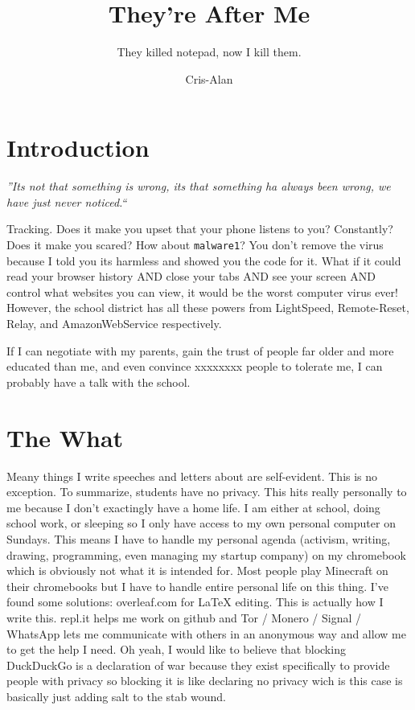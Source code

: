 \documentclass{article}
\title{They're After Me}
\author{They killed notepad, now I kill them.}
\date{Cris-Alan}
\begin{document}
\maketitle
\pagestyle{fancy}
\thispagestyle{fancy}
\section{Introduction}
\begin{center}
    \emph{''Its not that something is wrong, its that something ha always been wrong, we have just never noticed.``}
\end{center}
Tracking. Does it make you upset that your phone listens to you?
Constantly? Does it make you scared? How about \texttt{malware1}?
You don't remove the virus because I told you its harmless and 
showed you the code for it. What if it could read your browser
history AND close your tabs AND see your screen AND control
what websites you can view, it would be the worst computer virus 
ever!
However, the school district has all these powers from LightSpeed,
Remote-Reset, Relay, and AmazonWebService respectively.

If I can negotiate with my parents, gain the trust of people far 
older and more educated than me, and even convince xxxxxxxx people to tolerate me, I can probably have a talk with the school.

\section{The What}
Meany things I write speeches and letters about are self-evident.
This is no exception. To summarize, students
have no privacy. This hits really personally to me because
I don't exactingly have a home life. I am either at school,
doing school work, or sleeping so I only have access to my own
personal computer on Sundays. This means I have to handle my 
personal agenda (activism, writing, drawing, programming, 
even managing my startup company) on my chromebook which is 
obviously not what it is intended for. Most people play Minecraft
on their chromebooks but I have to handle entire personal life 
on this thing. I've found some solutions: overleaf.com for \LaTeX{}
editing. This is actually how I write this. repl.it helps me work
on github and Tor / Monero / Signal / WhatsApp lets me communicate
with others in an anonymous way and allow me to get the help I 
need. Oh yeah, I would like to believe that blocking DuckDuckGo is a
declaration of war because they exist specifically to provide
people with privacy so blocking it is like declaring no privacy
wich is this case is basically just adding salt to the stab wound.
\end{document}
